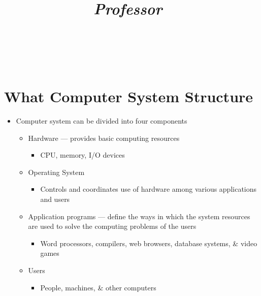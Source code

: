 \documentclass[titlepage]{article}
\title{
  \textmd{\LARGE{\textbf{\noteTitle}}}\\
  \textmd{\Large{\textit{\class}}}\\
  \textmd{\Large{\textit{Professor\ \professor}}}\\
  \textmd{\normalsize{\classTime}}\\
  \vspace{3.5in}
  \textmd{\LARGE{\textbf{\notesAuthor}}}\\
  \date{}
}
\begin{document}
  \maketitle

  \section*{What Computer System Structure}
  \begin{itemize}
    \item Computer system can be divided into four components
    \begin{itemize}
      \item Hardware --- provides basic computing resources
      \begin{itemize}
        \item CPU, memory, I/O devices
      \end{itemize}
      \item Operating System
      \begin{itemize}
        \item Controls and coordinates use of hardware among various applications and users
      \end{itemize}
      \item Application programs ---  define the ways in which the system resources are used to solve the computing problems of the users
      \begin{itemize}
        \item Word processors, compilers, web browsers, database systems, \& video games
      \end{itemize}
      \item Users
      \begin{itemize}
        \item People, machines, \& other computers
      \end{itemize}
    \end{itemize}
  \end{itemize}
\end{document}
